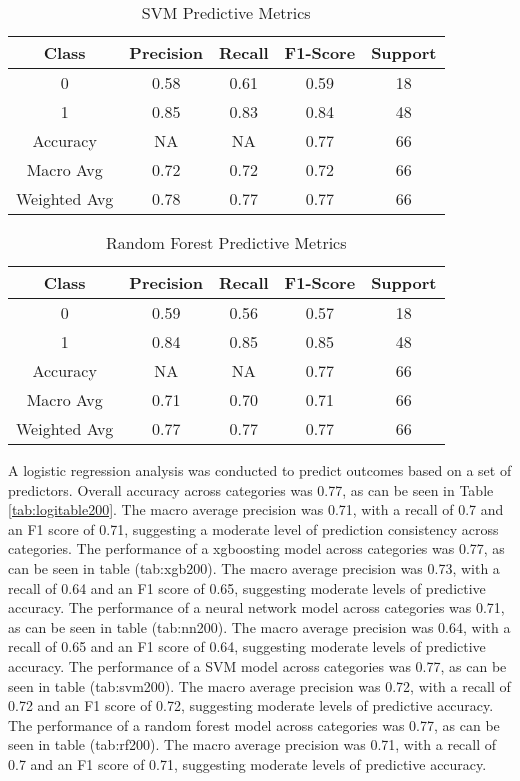 \documentclass[
  man]{apa7}
\begin{document}
\begin{table}
\centering
\caption{\label{tab:svm200}SVM Predictive Metrics}
\centering
\fontsize{12}{14}\selectfont
\begin{tabular}[t]{c|c|c|c|c}
\hline
Class & Precision & Recall & F1-Score & Support\\
\hline
0 & 0.58 & 0.61 & 0.59 & 18\\
\hline
1 & 0.85 & 0.83 & 0.84 & 48\\
\hline
Accuracy & NA & NA & 0.77 & 66\\
\hline
Macro Avg & 0.72 & 0.72 & 0.72 & 66\\
\hline
Weighted Avg & 0.78 & 0.77 & 0.77 & 66\\
\hline
\end{tabular}
\end{table}

\begin{table}
\centering
\caption{\label{tab:rf200}Random Forest Predictive Metrics}
\centering
\fontsize{12}{14}\selectfont
\begin{tabular}[t]{c|c|c|c|c}
\hline
Class & Precision & Recall & F1-Score & Support\\
\hline
0 & 0.59 & 0.56 & 0.57 & 18\\
\hline
1 & 0.84 & 0.85 & 0.85 & 48\\
\hline
Accuracy & NA & NA & 0.77 & 66\\
\hline
Macro Avg & 0.71 & 0.70 & 0.71 & 66\\
\hline
Weighted Avg & 0.77 & 0.77 & 0.77 & 66\\
\hline
\end{tabular}
\end{table}

A logistic regression analysis was conducted to predict outcomes based on a set of predictors. Overall accuracy across categories was 0.77, as can be seen in Table \ref{tab:logitable200}. The macro average precision was 0.71, with a recall of 0.7 and an F1 score of 0.71, suggesting a moderate level of prediction consistency across categories.
The performance of a xgboosting model across categories was 0.77, as can be seen in table (tab:xgb200). The macro average precision was 0.73, with a recall of 0.64 and an F1 score of 0.65, suggesting moderate levels of predictive accuracy.
The performance of a neural network model across categories was 0.71, as can be seen in table (tab:nn200). The macro average precision was 0.64, with a recall of 0.65 and an F1 score of 0.64, suggesting moderate levels of predictive accuracy.
The performance of a SVM model across categories was 0.77, as can be seen in table (tab:svm200). The macro average precision was 0.72, with a recall of 0.72 and an F1 score of 0.72, suggesting moderate levels of predictive accuracy.
The performance of a random forest model across categories was 0.77, as can be seen in table (tab:rf200). The macro average precision was 0.71, with a recall of 0.7 and an F1 score of 0.71, suggesting moderate levels of predictive accuracy.
\end{document}
